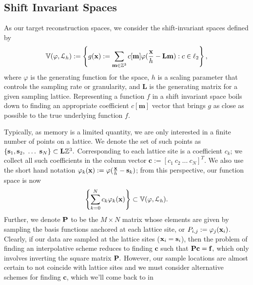 \subsection{Shift Invariant Spaces} \label{sec:sis_review}
As our target reconstruction spaces, we consider the shift-invariant spaces defined by {\small 
\begin{equation*}
	\mathbb{V}(\varphi,  \mathcal{L}_h) := \left\{ g(\mathbf{x}) := \displaystyle\sum_{\mathbf{m} \in \mathbb{Z}^3} c[\mathbf{m}]\varphi(\frac{\mathbf{x}}{h} - \mathbf{Lm}) : c \in \ell_2 \right\},
\end{equation*}}
where $\varphi$ is the generating function for the space, $h$ is a scaling parameter that controls the sampling rate or granularity, and $\mathbf{L}$ is the generating matrix for a given sampling lattice. Representing a function $f$ in a shift invariant space boils down to finding an appropriate coefficient $c[\mathbf{m}]$ vector that brings $g$ as close as possible to the true underlying function $f$. 

Typically, as memory is a limited quantity, we are only interested in a finite number of points on a lattice. We denote the set of such points as $\{\mathbf{s}_1,\mathbf{s}_2,\ \hdots  \ \mathbf{s}_N\} \subset \mathbf{L}\intn^3.$ Corresponding to each lattice site is a coefficient $c_k$; we collect all such coefficients in the column vector $\mathbf{c}:=\left[c_1 \ c_2 \ \hdots \ c_N \right]^T.$ We also use the short hand notation $\varphi_k(\mathbf{x}) := \varphi(\frac{\mathbf{x}}{h}-\mathbf{s}_k)$; from this perspective, our function space is now {\small 
\begin{equation}
	\left\{ \displaystyle\sum_{k=0}^N c_k \varphi_k(\mathbf{x}) \right\} \subset \mathbb{V}(\varphi, \mathcal{L}_h).
\end{equation}}
Further, we denote $\mathbf{\mathbf{P}}$ to be the $M \times N$ matrix whose elements are given by sampling the basis functions anchored at each lattice site, or $P_{i,j} := \varphi_j(\mathbf{x}_i)$. Clearly, if our data are sampled at the lattice sites ($\mathbf{x}_i = \mathbf{s}_i$), then the problem of finding an interpolative scheme reduces to finding $\mathbf{c}$ such that $\mathbf{\mathbf{P} c=f},$ which only involves inverting the square matrix $\mathbf{\mathbf{P}}.$ However, our sample locations are almost certain to not coincide with lattice sites and we must consider alternative schemes for finding $\mathbf{c}$, which we'll come back to in 

